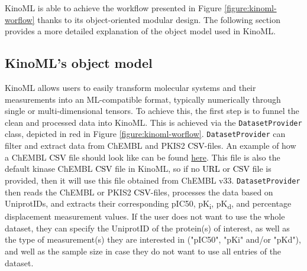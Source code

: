 \documentclass[9pt,lessons, pubversion]{livecoms}
\newcommand{\revision}[1]{\textcolor{black}{#1}}
\begin{document}
KinoML is able to achieve the workflow presented in Figure \ref{figure:kinoml-worflow} thanks to its object-oriented modular design. The following section provides a more detailed explanation of the object model used in KinoML.

\subsection{KinoML's object model}



KinoML allows users to easily transform molecular systems and their measurements into an ML-compatible format, typically numerically through single or multi-dimensional tensors. To achieve this, the first step is to funnel the clean and processed data into KinoML. This is achieved via the \texttt{DatasetProvider} class, depicted in red in Figure \ref{figure:kinoml-worflow}. \texttt{DatasetProvider} can filter and extract data from ChEMBL and PKIS2 \revision{CSV}-files. An example of how a ChEMBL \revision{CSV} file should look like can be found \href{https://github.com/openkinome/kinodata/blob/master/data/human_kinases_and_chembl_targets.chembl_33.csv}{here}. This file is also the default kinase ChEMBL \revision{CSV} file in KinoML, so if no \revision{URL} or \revision{CSV} file is provided, then it will use this file obtained from ChEMBL v33. \texttt{DatasetProvider} then reads the ChEMBL or PKIS2 \revision{CSV}-files, processes the data based on UniprotIDs, and extracts their corresponding pIC50, pK\textsubscript{i}, pK\textsubscript{d}, and percentage displacement measurement values. If the user does not want to use the whole dataset, they can specify the UniprotID of the protein(s) of interest, as well as the type of measurement(s) they are interested in ("pIC50", "pKi" and/or "pKd"), and well as the sample size in case they do not want to use all entries of the dataset. 
\end{document}

